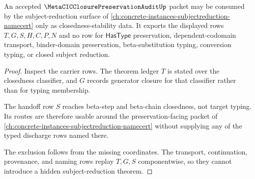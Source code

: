 \begin{theorem}
\label{thm:metacic-closure-preservation-audit-subject-reduction-boundary}
An accepted $\MetaCICClosurePreservationAuditUp$ packet may be consumed by the subject-reduction surface of \autoref{ch:concrete-instances-subjectreduction-namecert} only as closedness-stability data. It exports the displayed rows $T,G,S,H,C,P,N$ and no row for $\mathsf{HasType}$ preservation, dependent-codomain transport, binder-domain preservation, beta-substitution typing, conversion typing, or closed subject reduction.
\end{theorem}
\begin{proof}
Inspect the carrier rows. The theorem ledger $T$ is stated over the closedness classifier, and $G$ records generator closure for that classifier rather than for typing membership.

The handoff row $S$ reaches beta-step and beta-chain closedness, not target typing. Its routes are therefore usable around the preservation-facing packet of \autoref{ch:concrete-instances-subjectreduction-namecert} without supplying any of the typed discharge rows named there.

The exclusion follows from the missing coordinates. The transport, continuation, provenance, and naming rows replay $T,G,S$ componentwise, so they cannot introduce a hidden subject-reduction theorem.
\end{proof}


\begin{closurestatus}{\MetaCICClosurePreservationAuditUp}
  \theoryclosure{\seedClosure}
  \formalstatus{\unformalizedV}
\end{closurestatus}

